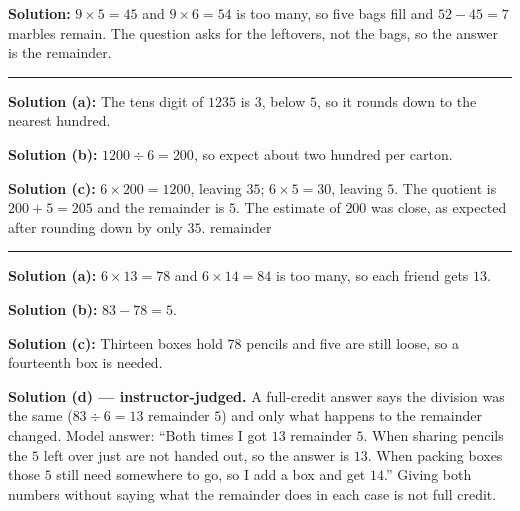 \documentclass[12pt]{article}
\begin{document}

\textbf{Solution:} $9 \times 5 = 45$ and $9 \times 6 = 54$ is too many, so five bags fill and
$52 - 45 = 7$ marbles remain. The question asks for the leftovers, not the bags, so the answer is
the remainder. 

\vspace{0.12cm}\noindent\rule{\linewidth}{0.2pt}


\textbf{Solution (a):} The tens digit of $1235$ is $3$, below $5$, so it rounds down to the nearest
hundred. 

\textbf{Solution (b):} $1200 \div 6 = 200$, so expect about two hundred per carton. 

\textbf{Solution (c):} $6 \times 200 = 1200$, leaving $35$; $6 \times 5 = 30$, leaving $5$. The
quotient is $200 + 5 = 205$ and the remainder is $5$. The estimate of $200$ was close, as expected
after rounding down by only $35$.  \quad remainder 

\vspace{0.12cm}\noindent\rule{\linewidth}{0.2pt}


\textbf{Solution (a):} $6 \times 13 = 78$ and $6 \times 14 = 84$ is too many, so each friend gets
$13$. 

\textbf{Solution (b):} $83 - 78 = 5$. 

\textbf{Solution (c):} Thirteen boxes hold $78$ pencils and five are still loose, so a fourteenth box
is needed. 

\textbf{Solution (d) --- instructor-judged.} A full-credit answer says the division was the same
($83 \div 6 = 13$ remainder $5$) and only what happens to the remainder changed. Model answer: ``Both
times I got $13$ remainder $5$. When sharing pencils the $5$ left over just are not handed out, so the
answer is $13$. When packing boxes those $5$ still need somewhere to go, so I add a box and get $14$.''
Giving both numbers without saying what the remainder does in each case is not full credit.
\end{document}
